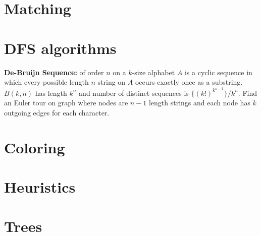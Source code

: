  
\section{Matching}

\section{DFS algorithms}
  \textbf{De-Bruijn Sequence:} of order $n$ on a $k$-size alphabet $A$ is a cyclic sequence in which every possible length $n$ string on $A$ occurs exactly once as a substring. $B(k, n)$ has length $k^n$ and number of distinct sequences is $\{(k!)^{k^{n - 1}}\}/k^n$. Find an Euler tour on graph where nodes are $n-1$ length strings and each node has $k$ outgoing edges for each character.


\section{Coloring}

\section{Heuristics}

\section{Trees}
